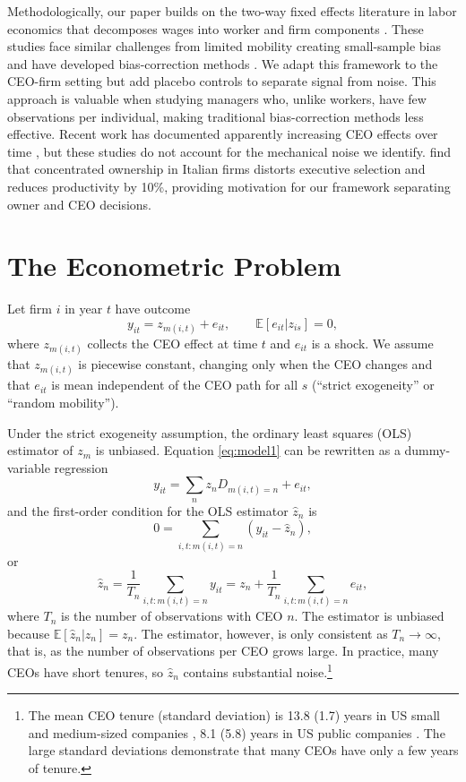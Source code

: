 \documentclass[11pt,a4paper]{article}
\begin{document}
Methodologically, our paper builds on the two-way fixed effects literature in labor economics that decomposes wages into worker and firm components \citep{Abowd1999Econometrica, Card2018JoLE}. These studies face similar challenges from limited mobility creating small-sample bias \citep{andrews2008high} and have developed bias-correction methods \citep{Bonhomme2023-dx, gaure2014correlation}. We adapt this framework to the CEO-firm setting but add placebo controls to separate signal from noise. This approach is valuable when studying managers who, unlike workers, have few observations per individual, making traditional bias-correction methods less effective. Recent work has documented apparently increasing CEO effects over time \citep{quigley2015has}, but these studies do not account for the mechanical noise we identify. \citet{lippi2014corporate} find that concentrated ownership in Italian firms distorts executive selection and reduces productivity by 10\%, providing motivation for our framework separating owner and CEO decisions.

\section{The Econometric Problem}

Let firm $i$ in year $t$ have outcome
\begin{equation}\label{eq:model1}
  y_{it} = z_{m(i,t)} + e_{it},\qquad \mathbb E[e_{it}|z_{is}]=0,
\end{equation}
where $z_{m(i,t)}$ collects the CEO effect at time $t$ and $e_{it}$ is a shock. We assume that $z_{m(i,t)}$ is piecewise constant, changing only when the CEO changes and that $e_{it}$ is mean independent of the CEO path for all $s$ (``strict exogeneity'' or ``random mobility'').

Under the strict exogeneity assumption, the ordinary least squares (OLS) estimator of $z_m$ is unbiased. Equation \eqref{eq:model1} can be rewritten as a dummy-variable regression 
$$
y_{it} = \sum_{n} z_n D_{m(i,t)=n}  + e_{it},
$$
and the first-order condition for the OLS estimator $\hat z_n$ is
$$
0 = \sum_{i,t:m(i,t)=n} (y_{it} - \hat z_n),
$$
or 
$$
\hat z_n = \frac{1}{T_n} \sum_{i,t:m(i,t)=n} y_{it} = z_n + \frac{1}{T_n} \sum_{i,t:m(i,t)=n} e_{it},
$$
where $T_n$ is the number of observations with CEO $n$. The estimator is unbiased because $\mathbb E[\hat z_n|z_n] = z_n$. The estimator, however, is only consistent as $T_n\to\infty$, that is, as the number of observations per CEO grows large. In practice, many CEOs have short tenures, so $\hat z_n$ contains substantial noise.\footnote{The mean CEO tenure (standard deviation) is 13.8 (1.7) years in US small and medium-sized companies \citep{simsek2007ceo}, 8.1 (5.8) years in US public companies \citep{brookman2009ceo}. The large standard deviations demonstrate that many CEOs have only a few years of tenure.} 
\end{document}
